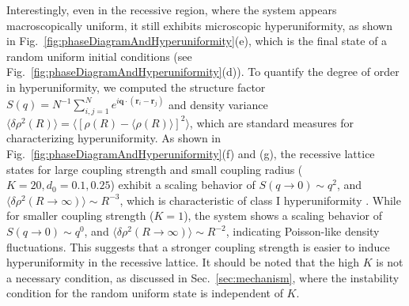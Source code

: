 \documentclass{article}
\begin{document}
Interestingly, even in the recessive region, where the system appears macroscopically uniform, it still exhibits microscopic hyperuniformity, as shown in Fig.~\ref{fig:phaseDiagramAndHyperuniformity}(e), which is the final state of a random uniform initial conditions (see Fig.~\ref{fig:phaseDiagramAndHyperuniformity}(d)).
To quantify the degree of order in hyperuniformity, we computed the structure factor $S(q)=N^{-1}\sum_{i,j=1}^{N}e^{i\mathbf{q}\cdot(\mathbf{r}_i-\mathbf{r}_j)}$ and density variance $\langle \delta \rho ^2\left( R \right) \rangle =\langle \left[ \rho \left( R \right) -\langle \rho \left( R \right) \rangle \right] ^2\rangle $, which are standard measures for characterizing hyperuniformity\cite{PhysRevE.68.041113,TORQUATO20181}. 
As shown in Fig.~\ref{fig:phaseDiagramAndHyperuniformity}(f) and (g), the recessive lattice states for large coupling strength and small coupling radius ($K=20, d_0=0.1,0.25$) exhibit a scaling behavior of $S(q\to 0)\sim q^{2}$, and $\langle \delta \rho ^2\left( R \to \infty \right) \rangle \sim R^{-3}$, which is characteristic of class I hyperuniformity \cite{TORQUATO20181}. While for smaller coupling strength ($K=1$), the system shows a scaling behavior of $S(q\to 0)\sim q^{0}$, and $\langle \delta \rho ^2\left( R \to \infty \right) \rangle \sim R^{-2}$, indicating Poisson-like density fluctuations. This suggests that a stronger coupling strength is easier to induce hyperuniformity in the recessive lattice. It should be noted that the high $K$ is not a necessary condition, as discussed in Sec.~\ref{sec:mechanism}, where the instability condition for the random uniform state is independent of $K$.


\end{document}
